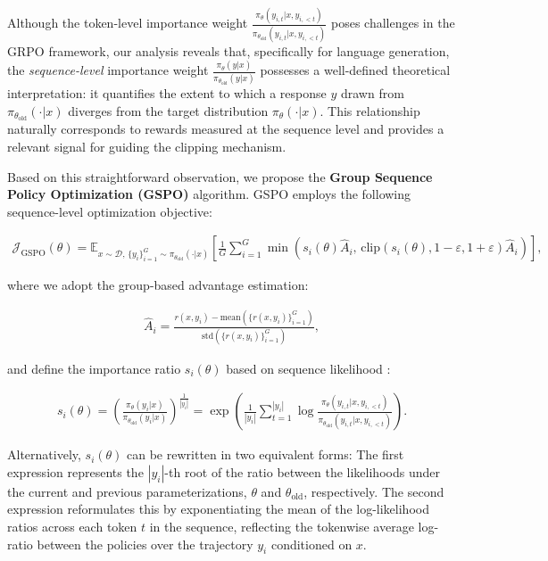 Although the token-level importance weight $\frac{ \pi_{\theta} (y_{i,t} | x, y_{i,<t}) }{ \pi_{\theta_\text{old}} (y_{i,t} | x,y_{i,<t})}$ poses challenges in the GRPO framework, our analysis reveals that, specifically for language generation, the \textit{sequence-level} importance weight $\frac{ \pi_{\theta} (y | x) }{ \pi_{\theta_\text{old}} (y | x)}$ possesses a well-defined theoretical interpretation: it quantifies the extent to which a response $y$ drawn from $\pi_{\theta_\text{old}} (\cdot | x)$ diverges from the target distribution $\pi_{\theta} (\cdot | x)$. This relationship naturally corresponds to rewards measured at the sequence level and provides a relevant signal for guiding the clipping mechanism.

Based on this straightforward observation, we propose the \textbf{Group Sequence Policy Optimization (GSPO)} algorithm. GSPO employs the following sequence-level optimization objective:

\begin{align}
\mathcal{J}_\text{GSPO} (\theta) =
\mathbb{E}_{ x \sim \mathcal{D},\, \{y_i\}_{i=1}^G \sim \pi_{\theta_\text{old}}( \cdot | x) }
\left[ 
\frac{1}{G} \sum_{i=1}^{G}
\min \left( s_{i}(\theta)  \widehat{A}_{i},  \, \mathrm{clip} \left( s_{i}(\theta), 1 - {\varepsilon}, 1 + {\varepsilon} \right) \widehat{A}_{i} \right) 
\right],
\label{equ:gspo}
\end{align}

where we adopt the group-based advantage estimation:

\begin{align}
\widehat{A}_{i} = \frac{r(x, y_i) - \mathrm{mean} \left( \{ r(x, y_i) \}_{i=1}^G \right) }{ \mathrm{std} \left( \{ r(x, y_i) \}_{i=1}^G \right) },
\end{align}

and define the importance ratio $s_{i}(\theta)$ based on sequence likelihood \citep{click}:

\begin{align}
s_{i}(\theta) = \left( \frac{ \pi_{\theta} (y_i | x) }{ \pi_{\theta_\text{old}} (y_i | x)} \right)^{\frac{1}{|y_i|}}
=
\exp \left( \frac{1}{|y_i|} \sum_{t=1}^{|y_i|} \log \frac{ \pi_{\theta} (y_{i,t} | x, y_{i,<t}) }{ \pi_{\theta_\text{old}} (y_{i,t} | x,y_{i,<t})} \right).
\end{align}

Alternatively, $s_i(\theta)$ can be rewritten in two equivalent forms: The first expression represents the $|y_i|$-th root of the ratio between the likelihoods under the current and previous parameterizations, $\theta$ and $\theta_\text{old}$, respectively. The second expression reformulates this by exponentiating the mean of the log-likelihood ratios across each token $t$ in the sequence, reflecting the tokenwise average log-ratio between the policies over the trajectory $y_i$ conditioned on $x$.

